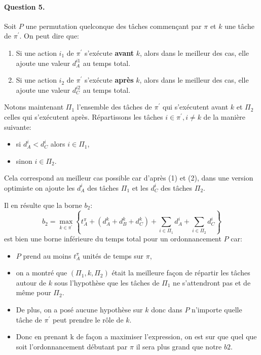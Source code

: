 \documentclass[a4paper, 10pt]{article}
\begin{document}
		\paragraph{Question 5.}{Soit $P$ une permutation quelconque des tâches commençant par $\pi$ et $k$ une tâche de $\pi^\prime$. On peut dire que:
		\begin{enumerate}
			\item Si une action $i_1$ de $\pi^\prime$ s'exécute \textbf{avant} $k$, alors dans le meilleur des cas, elle ajoute une valeur $d^{i1}_A$ au temps total. 
			\item Si une action $i_2$ de $\pi^\prime$  s'exécute \textbf{après} $k$, alors dans le meilleur des cas, elle ajoute une valeur $d^{i2}_C$ au temps total.
		\end{enumerate}
		
		Notons maintenant $\Pi_1$ l'ensemble des tâches de $\pi^\prime$ qui s'exécutent avant $k$ et $\Pi_2$ celles qui s'exécutent après. Répartissons les tâches $i \in \pi^\prime, i \ne k$ de la manière suivante:
		\begin{itemize}
			\item si $d^i_A < d^i_C$ alors $i \in \Pi_1$,
			\item sinon $i \in \Pi_2$.
		\end{itemize}
		Cela correspond au meilleur cas possible car d'après (1) et (2), dans une version optimiste on ajoute les $d^i_A$ des tâches $\Pi_1$ et les $d^i_C$ des tâches $\Pi_2$.
		
		Il en résulte que la borne $b_2$:
		\begin{equation*}
			b_2 = \max_{k \in \pi^\prime} \left\{ t^{\pi}_A + \left(d^k_A + d^k_B + d^k_C \right) + \sum_{i \in \Pi_1} d^i_A + \sum_{i \in \Pi_2} d^i_C \right\}
		\end{equation*}
		est bien une borne inférieure du temps total pour un ordonnancement $P$ car:
		\begin{itemize}
			\item $P$ prend au moins $t^\pi_A$ unités de temps sur $\pi$,
			\item on a montré que $\left(\Pi_1, k, \Pi_2\right)$ était la meilleure façon de répartir les tâches autour de $k$ sous l'hypothèse que les tâches de $\Pi_1$ ne s'attendront pas et de même pour $\Pi_2$.
			\item De plus, on a posé aucune hypothèse sur $k$ donc dans $P$ n'importe quelle tâche de $\pi^\prime$ peut prendre le rôle de $k$.
                        \item Donc en prenant k de façon a maximiser l'expression, on est sur que quel que soit l'ordonnancement débutant par $\pi$ il sera plus grand que notre $b2$.
		\end{itemize}
		}
		
\end{document}
